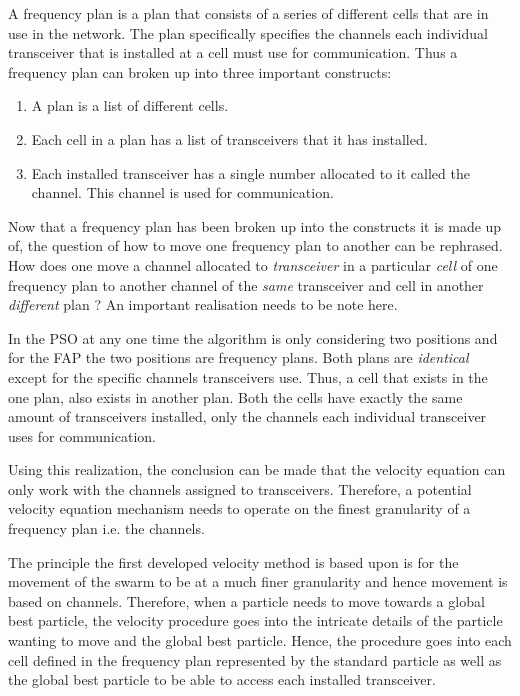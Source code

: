 A frequency plan is a plan that consists of a series of different cells that are in use in the network. The plan specifically specifies the channels each individual transceiver that is installed at a cell must use for communication. Thus a frequency plan can broken up into three important constructs:
\begin{enumerate}
\item A plan is a list of different cells.
\item Each cell in a plan has a list of transceivers that it has installed.
\item Each installed transceiver has a single number allocated to it called the channel. This channel is used for communication.
\end{enumerate}

Now that a frequency plan has been broken up into the constructs it is made up of, the question of how to move one frequency plan to another can be rephrased. How does one move a channel allocated to \emph{transceiver} in a particular \emph{cell} of one frequency plan to another channel of the \emph{same} transceiver and cell in another \emph{different} plan ? An important realisation needs to be note here.

In the PSO at any one time the algorithm is only considering two positions and for the FAP the two positions are frequency plans. Both plans are \emph{identical} except for the specific channels transceivers use. Thus, a cell that exists in the one plan, also exists in another plan. Both the cells have exactly the same amount of transceivers installed, only the channels each individual transceiver uses for communication.

Using this realization, the conclusion can be made that the velocity equation can only work with the channels assigned to transceivers. Therefore, a potential velocity equation mechanism needs to operate on the finest granularity of a frequency plan i.e. the channels.

The principle the first developed velocity method is based upon is for the movement of the swarm to be at a much finer granularity and hence movement is based on channels. Therefore, when a particle needs to move towards a global best particle, the velocity procedure goes into the intricate details of the particle wanting to move and the global best particle. Hence, the procedure goes into each cell defined in the frequency plan represented by the standard particle as well as the global best particle to be able to access each installed transceiver.

